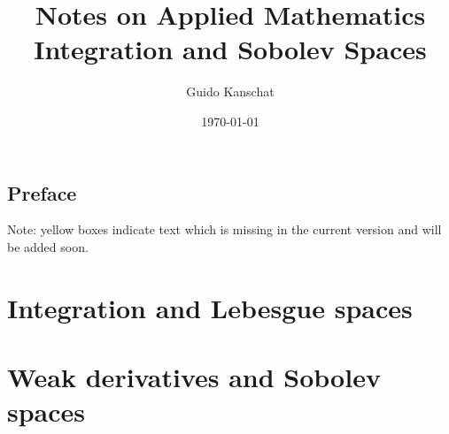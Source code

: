 \documentclass[USenglish,limits]{report}
\title{\textbf{Notes on Applied Mathematics}
\\[5mm]
{\large Integration and Sobolev Spaces}}
\author{Guido Kanschat}
\date{\today}
\begin{document}
\maketitle

\section*{Preface}


\begin{todo}
  Note: yellow boxes indicate text which is missing in the current
  version and will be added soon.
\end{todo}

\tableofcontents

\chapter{Integration and Lebesgue spaces}



\chapter{Weak derivatives and Sobolev spaces}


\printbibliography
\printindex
\end{document}
